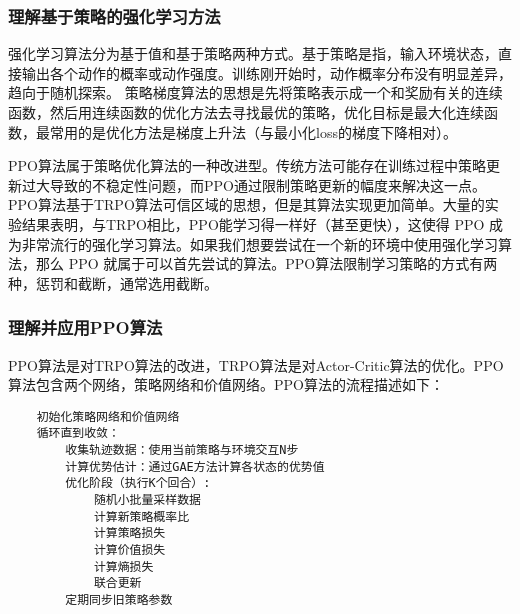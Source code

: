 \subsubsection{理解基于策略的强化学习方法}
强化学习算法分为基于值和基于策略两种方式。基于策略是指，输入环境状态，直接输出各个动作的概率或动作强度。训练刚开始时，动作概率分布没有明显差异，趋向于随机探索。
策略梯度算法的思想是先将策略表示成一个和奖励有关的连续函数，然后用连续函数的优化方法去寻找最优的策略，优化目标是最大化连续函数，最常用的是优化方法是梯度上升法（与最小化loss的梯度下降相对）。


PPO算法属于策略优化算法的一种改进型。传统方法可能存在训练过程中策略更新过大导致的不稳定性问题，而PPO通过限制策略更新的幅度来解决这一点。PPO算法基于TRPO算法可信区域的思想，但是其算法实现更加简单。大量的实验结果表明，与TRPO相比，PPO能学习得一样好（甚至更快），这使得 PPO 成为非常流行的强化学习算法。如果我们想要尝试在一个新的环境中使用强化学习算法，那么 PPO 就属于可以首先尝试的算法。PPO算法限制学习策略的方式有两种，惩罚和截断，通常选用截断。

\subsubsection{理解并应用PPO算法}
PPO算法是对TRPO算法的改进，TRPO算法是对Actor-Critic算法的优化。PPO算法包含两个网络，策略网络和价值网络。PPO算法的流程描述如下：
\begin{lstlisting}
    初始化策略网络和价值网络
    循环直到收敛：
        收集轨迹数据：使用当前策略与环境交互N步
        计算优势估计：通过GAE方法计算各状态的优势值
        优化阶段（执行K个回合）:
            随机小批量采样数据
            计算新策略概率比
            计算策略损失
            计算价值损失
            计算熵损失
            联合更新
        定期同步旧策略参数
\end{lstlisting}

